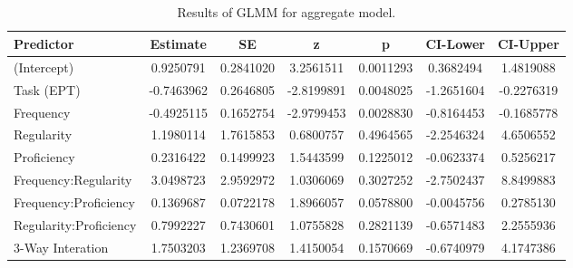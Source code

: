 \documentclass[
  english,
  man]{apa6}
\begin{document}
\begin{appendix}
\section{}
\begin{table}

\caption{\label{tab:table-for-aggregate-appendix}Results of GLMM for aggregate model.}
\centering
\begin{tabular}[t]{l|c|c|c|c|c|c}
\hline
Predictor & Estimate & SE & z & p & CI-Lower & CI-Upper\\
\hline
(Intercept) & 0.9250791 & 0.2841020 & 3.2561511 & 0.0011293 & 0.3682494 & 1.4819088\\
\hline
Task (EPT) & -0.7463962 & 0.2646805 & -2.8199891 & 0.0048025 & -1.2651604 & -0.2276319\\
\hline
Frequency & -0.4925115 & 0.1652754 & -2.9799453 & 0.0028830 & -0.8164453 & -0.1685778\\
\hline
Regularity & 1.1980114 & 1.7615853 & 0.6800757 & 0.4964565 & -2.2546324 & 4.6506552\\
\hline
Proficiency & 0.2316422 & 0.1499923 & 1.5443599 & 0.1225012 & -0.0623374 & 0.5256217\\
\hline
Frequency:Regularity & 3.0498723 & 2.9592972 & 1.0306069 & 0.3027252 & -2.7502437 & 8.8499883\\
\hline
Frequency:Proficiency & 0.1369687 & 0.0722178 & 1.8966057 & 0.0578800 & -0.0045756 & 0.2785130\\
\hline
Regularity:Proficiency & 0.7992227 & 0.7430601 & 1.0755828 & 0.2821139 & -0.6571483 & 2.2555936\\
\hline
3-Way Interation & 1.7503203 & 1.2369708 & 1.4150054 & 0.1570669 & -0.6740979 & 4.1747386\\
\hline
\end{tabular}
\end{table}

\begin{table}


\end{table}
\end{appendix}
\end{document}
